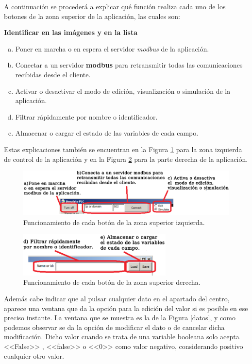 \documentclass[pdftex,11pt,a4paper]{book}
\begin{document}
A continuación se procederá a explicar qué función realiza cada uno de los botones de la zona superior de la aplicación, las cuales son:

\textbf{Identificar en las imágenes y en la lista}

\begin{enumerate}[a)]
\item Poner en marcha o en espera el servidor \emph{modbus} de la aplicación.
\item Conectar a un servidor \textbf{modbus} para retransmitir todas las comunicaciones recibidas desde el cliente.
\item Activar o desactivar el  modo de edición, visualización o simulación de la aplicación.
\item Filtrar rápidamente por nombre o identificador.
\item Almacenar o cargar el estado de las variables de cada campo.
\end{enumerate}

Estas explicaciones también se encuentran en la Figura \ref{izquierda} para la zona izquierda de control de la aplicación y en la Figura \ref{derecha} para la parte derecha de la aplicación. 

\begin{figure}
\includegraphics[width=\textwidth]{img/exp1.png}
\caption{\label{izquierda}Funcionamiento de cada botón de la zona superior izquierda.}
\end{figure}


\begin{figure}
\begin{center}
\includegraphics[width=0.69\textwidth]{img/exp2.png}
\caption{\label{derecha}Funcionamiento de cada botón de la zona superior derecha.}
\end{center}
\end{figure}

Además cabe indicar que al pulsar cualquier dato en el apartado del centro, aparece una ventana que da la opción para la edición del valor si es posible en ese preciso instante. La ventana que se muestra es la de la Figura \ref{datos}, y como podemos observar se da la opción de modificar el dato o de cancelar dicha modificación. Dicho valor cuando se trata de una variable booleana solo acepta <<False>> , <<false>> o <<0>> como valor negativo, considerando positivo cualquier otro valor.
\end{document}
